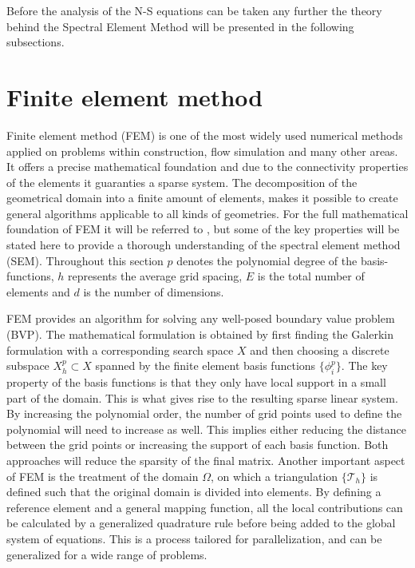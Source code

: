 Before the analysis of the N-S equations can be taken any further the theory behind the Spectral Element Method will be presented in the following
subsections.


\section{Finite element method}

Finite element method (FEM) is one of the most widely used numerical methods applied on problems within construction, flow simulation and many 
other areas. It offers a precise mathematical foundation and due to the connectivity properties of the elements 
it guaranties a sparse system. The decomposition of the geometrical domain into a finite amount of elements,
makes it possible to create general algorithms applicable to all kinds of geometries. 
For the full mathematical foundation of FEM it will be referred to \cite{Quarteroni}, but some of the key properties will be stated here
to provide a thorough understanding of the spectral element method (SEM). 
Throughout this section $p$ denotes the polynomial degree of the basis-functions, $h$ represents the average grid spacing, $E$ is the total
number of elements and $d$ is the number of dimensions. 

FEM provides an algorithm for solving any well-posed boundary value problem (BVP).
The mathematical formulation is obtained by first finding the Galerkin
formulation with a corresponding search space $X$ and then choosing a discrete subspace $X^p_h\subset X$ 
spanned by the finite element basis functions $\{\phi^p_i\}$.
The key property of the basis functions is that they only have local support in a small part of the domain. 
This is what gives rise to the resulting sparse linear system. 
By increasing the polynomial order, the number of grid points used to define the polynomial will need to increase as well.
This implies either reducing the distance between the grid points or increasing the support of each basis function.
Both approaches will reduce the sparsity of the final matrix.
Another important aspect of FEM is the treatment of the domain $\Omega$, 
on which a triangulation $\{\mathcal{T}_h\}$ is defined such that the original domain is divided into elements.
By defining a reference element and a general mapping function, all the local contributions can be calculated by a 
generalized quadrature rule before being added to the global system of equations. This is a process tailored for parallelization, and can 
be generalized for a wide range of problems.

